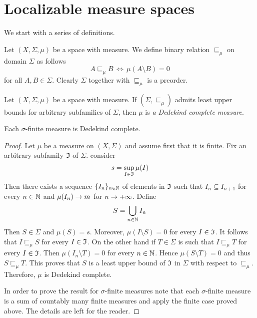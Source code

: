 \section{Localizable measure spaces}
\noindent
We start with a series of definitions.

\begin{definition}
  Let $(X,\Sigma,\mu)$ be a space with measure. We define binary relation $\sqsubseteq_{\mu}$ on domain $\Sigma$ as follows
  $$A \sqsubseteq_{\mu} B\,\Leftrightarrow\,\mu(A\setminus B) = 0$$
  for all $A, B \in \Sigma$. Clearly $\Sigma$ together with $\sqsubseteq_{\mu}$ is a preorder.
\end{definition}

\begin{definition}
  Let $(X,\Sigma,\mu)$ be a space with measure. If $\left(\Sigma, \sqsubseteq_{\mu}\right)$ admits least upper bounds for arbitrary subfamilies of $\Sigma$, then $\mu$ is \textit{a Dedekind complete measure}.
\end{definition}

\begin{proposition}\label{proposition:sigma_finite_measure_spaces_are_Dedekind_complete}
Each $\sigma$-finite measure is Dedekind complete.
\end{proposition}
\begin{proof}
  Let $\mu$ be a measure on $(X,\Sigma)$ and assume first that it is finite. Fix an arbitrary subfamily ${\mathfrak I}$ of $\Sigma$. consider
  $$s = \sup_{I\in {\mathfrak I}}\mu(I)$$
  Then there exists a sequence $\{I_n\}_{n\in {\mathbb N}}$ of elements in ${\mathfrak I}$ such that $I_{n} \subseteq I_{n+1}$ for every $n\in {\mathbb N}$ and $\mu(I_n) \rightarrow m$ for $n \rightarrow +\infty$. Define
  $$S = \bigcup_{n\in {\mathbb N}}I_n$$
  Then $S \in \Sigma$ and $\mu(S) = s$. Moreover, $\mu(I\setminus S) = 0$ for every $I \in {\mathfrak I}$. It follows that $I \sqsubseteq_{\mu}S$ for every $I \in {\mathfrak I}$. On the other hand if $T \in \Sigma$ is such that $I \sqsubseteq_{\mu} T$ for every $I \in {\mathfrak I}$. Then $\mu(I_n \setminus T) = 0$ for every $n \in {\mathbb N}$. Hence $\mu(S\setminus T) = 0$ and thus $S\sqsubseteq_{\mu} T$. This proves that $S$ is a least upper bound of ${\mathfrak I}$ in $\Sigma$ with respect to $\sqsubseteq_{\mu}$. Therefore, $\mu$ is Dedekind complete.

  In order to prove the result for $\sigma$-finite measures note that each $\sigma$-finite measure is a sum of countably many finite measures and apply the finite case proved above. The details are left for the reader.  
\end{proof}

